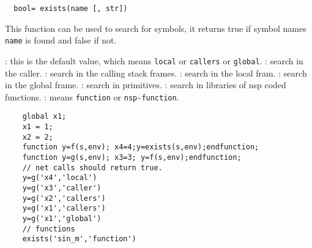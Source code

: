 \begin{mandesc}
\end{mandesc}
\begin{calling_sequence}
\begin{verbatim}
  bool= exists(name [, str])  
\end{verbatim}
\end{calling_sequence}
\begin{parameters}
\end{parameters}
\begin{mandescription}
  This function can be used to search for symbols, it returns true if 
  symbol names \verb+name+ is found and false if not. 
  \begin{varlist}
    : this is the default value, which  means \verb+local+ or 
    \verb+callers+ or \verb+global+.
    :  search in the caller. 
    : search in the calling stack frames.
    : search in the local fram.
    : search in the global frame.
    : search in primitives. 
    : search in libraries of nsp coded functions.
    : means \verb+function+ or \verb+nsp-function+.
  \end{varlist}
\end{mandescription}
\begin{examples}
  \begin{Verbatim}
    global x1;
    x1 = 1;
    x2 = 2;
    function y=f(s,env); x4=4;y=exists(s,env);endfunction;
    function y=g(s,env); x3=3; y=f(s,env);endfunction;
    // net calls should return true.
    y=g('x4','local')
    y=g('x3','caller')
    y=g('x2','callers')
    y=g('x1','callers')
    y=g('x1','global')
    // functions 
    exists('sin_m','function')
  \end{Verbatim}
\end{examples}
\begin{manseealso}
\end{manseealso}
